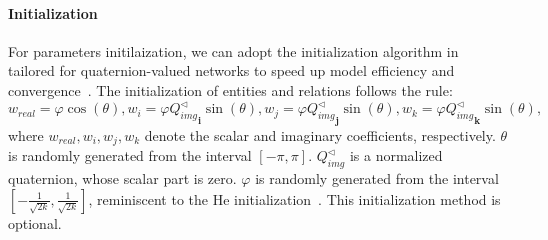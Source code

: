 \documentclass{article}
\begin{document}
\paragraph{Initialization} For parameters initilaization, we can adopt the initialization algorithm in~\citep{Parcollet2018QuaternionRN} tailored for quaternion-valued networks to speed up model efficiency and convergence~\citep{glorot2010understanding}. The initialization of entities and relations follows the rule:
\begin{equation}
w_{real} = \varphi \cos(\theta), w_i = \varphi  {Q_{img}^{\triangleleft}}_\textbf{i}\sin(\theta), w_j = \varphi {Q_{img}^{\triangleleft}}_\textbf{j}\sin(\theta), w_k = \varphi {Q_{img}^{\triangleleft}}_\textbf{k}\sin(\theta),
\end{equation}
where $w_{real}, w_i, w_j, w_k$ denote the scalar and imaginary coefficients, respectively. $\theta$ is randomly generated from the interval $[-\pi, \pi]$. $Q_{img}^{\triangleleft}$ is a normalized quaternion, whose scalar part is zero. $\varphi$ is randomly generated from the interval $[-\frac{1}{\sqrt{2k}}, \frac{1}{\sqrt{2k}}]$, reminiscent to the He initialization~\citep{he2015delving}. This initialization method is optional.
\end{document}
